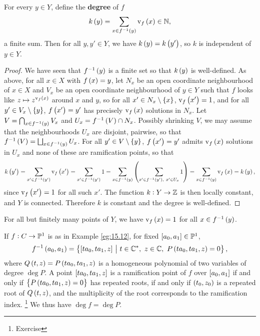 
\begin{lemma}
For every $ y \in Y $, define the \textbf{degree} of $ f $
$$ k\br{y} = \sum_{x \in f^{-1}\br{y}} \v_f\br{x} \in \NN, $$
a finite sum. Then for all $ y, y' \in Y $, we have $ k\br{y} = k\br{y'} $, so $ k $ is independent of $ y \in Y $.
\end{lemma}

\begin{proof}
We have seen that $ f^{-1}\br{y} $ is a finite set so that $ k\br{y} $ is well-defined. As above, for all $ x \in X $ with $ f\br{x} = y $, let $ N_x $ be an open coordinate neighbourhood of $ x \in X $ and $ V_x $ be an open coordinate neighbourhood of $ y \in Y $ such that $ f $ looks like $ z \mapsto z^{\v_f\br{x}} $ around $ x $ and $ y $, so for all $ x' \in N_x \setminus \cbr{x} $, $ \v_f\br{x'} = 1 $, and for all $ y' \in V_x \setminus \cbr{y} $, $ f\br{x'} = y' $ has precisely $ \v_f\br{x} $ solutions in $ N_x $. Let $ V = \bigcap_{x \in f^{-1}\br{y}} V_x $ and $ U_x = f^{-1}\br{V} \cap N_x $. Possibly shrinking $ V $, we may assume that the neighbourhoods $ U_x $ are disjoint, pairwise, so that $ f^{-1}\br{V} = \bigsqcup_{x \in f^{-1}\br{y}} U_x $. For all $ y' \in V \setminus \cbr{y} $, $ f\br{x'} = y' $ admits $ \v_f\br{x} $ solutions in $ U_x $ and none of these are ramification points, so that
$$ k\br{y'} = \sum_{x' \in f^{-1}\br{y'}} \v_f\br{x'} = \sum_{x' \in f^{-1}\br{y'}} 1 = \sum_{x \in f^{-1}\br{y}} \br{\sum_{x' \in f^{-1}\br{y'}, \ x' \in U_x} 1} = \sum_{x \in f^{-1}\br{y}} \v_f\br{x} = k\br{y}, $$
since $ \v_f\br{x'} = 1 $ for all such $ x' $. The function $ k : Y \to \mathbb{Z} $ is then locally constant, and $ Y $ is connected. Therefore $ k $ is constant and the degree is well-defined.
\end{proof}

\begin{remark*}
For all but finitely many points of $ Y $, we have $ \v_f\br{x} = 1 $ for all $ x \in f^{-1}\br{y} $.
\end{remark*}

\begin{example}
\label{eg:17.14}
If $ f : C \to \mathbb{P}^1 $ is as in Example \ref{eg:15.12}, for fixed $ \sbr{a_0, a_1} \in \PP^1 $,
$$ f^{-1}\br{a_0, a_1} = \cbr{\sbr{ta_0, ta_1, z} \st t \in \CC^*, \ z \in \CC, \ P\br{ta_0, ta_1, z} = 0}, $$
where $ Q\br{t, z} = P\br{ta_0, ta_1, z} $ is a homogeneous polynomial of two variables of degree $ \deg P $. A point $ \sbr{ta_0, ta_1, z} $ is a ramification point of $ f $ over $ \sbr{a_0, a_1} $ if and only if $ \cbr{P\br{ta_0, ta_1, z} = 0} $ has repeated roots, if and only if $ \br{t_0, z_0} $ is a repeated root of $ Q\br{t, z} $, and the multiplicity of the root corresponds to the ramification index. \footnote{Exercise} We thus have $ \deg f = \deg P $.
\end{example}

